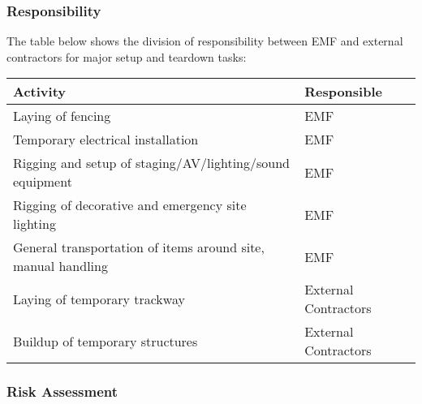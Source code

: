 \subsubsection{Responsibility}
The table below shows the division of responsibility between EMF and external contractors
for major setup and teardown tasks:

\begin{table}[h!]
\begin{tabular}{| p{10cm} | l |}
\hline
\textbf{Activity} & \textbf{Responsible} \\ \hline
Laying of fencing & EMF \\
Temporary electrical installation & EMF \\
Rigging and setup of staging/AV/lighting/sound equipment & EMF \\
Rigging of decorative and emergency site lighting & EMF \\
General transportation of items around site, manual handling & EMF \\
Laying of temporary trackway & External Contractors \\
Buildup of temporary structures & External Contractors \\
\hline
\end{tabular}
\end{table}

\subsubsection{Risk Assessment}

